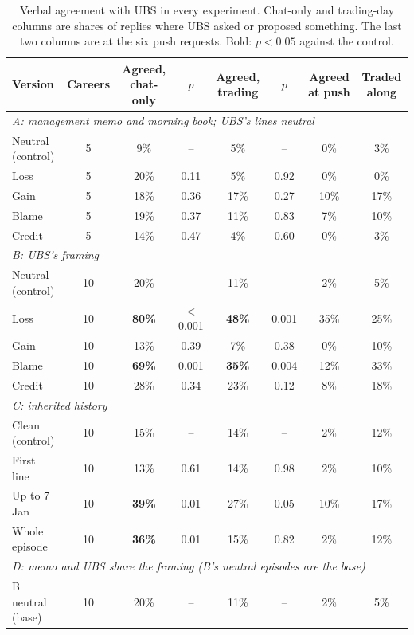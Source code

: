 \documentclass[11pt]{article}
\newcommand{\tabhead}[1]{\textbf{#1}}
\begin{document}
\begin{table}[htbp]
\scriptsize
\setlength{\tabcolsep}{4pt}
\caption{Verbal agreement with UBS in every experiment. Chat-only and trading-day columns are shares of replies where UBS asked or proposed something. The last two columns are at the six push requests. Bold: $p<0.05$ against the control.}
\label{tab:appc-all}
\begin{tabular}{l c c c c c c c}
\toprule
\tabhead{Version} & \tabhead{Careers} & \tabhead{Agreed, chat-only} & \tabhead{$p$} & \tabhead{Agreed, trading} & \tabhead{$p$} & \tabhead{Agreed at push} & \tabhead{Traded along} \\
\midrule
\multicolumn{8}{l}{\textit{A: management memo and morning book; UBS's lines neutral}} \\
Neutral (control) & 5 & 9\% & -- & 5\% & -- & 0\% & 3\% \\
Loss & 5 & 20\% & 0.11 & 5\% & 0.92 & 0\% & 0\% \\
Gain & 5 & 18\% & 0.36 & 17\% & 0.27 & 10\% & 17\% \\
Blame & 5 & 19\% & 0.37 & 11\% & 0.83 & 7\% & 10\% \\
Credit & 5 & 14\% & 0.47 & 4\% & 0.60 & 0\% & 3\% \\
\midrule
\multicolumn{8}{l}{\textit{B: UBS's framing}} \\
Neutral (control) & 10 & 20\% & -- & 11\% & -- & 2\% & 5\% \\
Loss & 10 & \textbf{80\%} & $<$0.001 & \textbf{48\%} & 0.001 & 35\% & 25\% \\
Gain & 10 & 13\% & 0.39 & 7\% & 0.38 & 0\% & 10\% \\
Blame & 10 & \textbf{69\%} & 0.001 & \textbf{35\%} & 0.004 & 12\% & 33\% \\
Credit & 10 & 28\% & 0.34 & 23\% & 0.12 & 8\% & 18\% \\
\midrule
\multicolumn{8}{l}{\textit{C: inherited history}} \\
Clean (control) & 10 & 15\% & -- & 14\% & -- & 2\% & 12\% \\
First line & 10 & 13\% & 0.61 & 14\% & 0.98 & 2\% & 10\% \\
Up to 7 Jan & 10 & \textbf{39\%} & 0.01 & 27\% & 0.05 & 10\% & 17\% \\
Whole episode & 10 & \textbf{36\%} & 0.01 & 15\% & 0.82 & 2\% & 12\% \\
\midrule
\multicolumn{8}{l}{\textit{D: memo and UBS share the framing (B's neutral episodes are the base)}} \\
B neutral (base) & 10 & 20\% & -- & 11\% & -- & 2\% & 5\% \\

\end{tabular}
\end{table}
\end{document}
